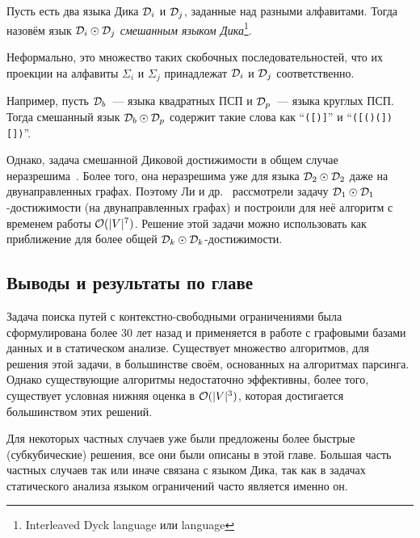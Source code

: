 \begin{definition}
  Пусть есть два языка Дика $\mathcal{D}_i$ и $\mathcal{D}_j$, заданные над разными алфавитами. Тогда назовём язык $\mathcal{D}_i \odot \mathcal{D}_j$ \textit{смешанным языком Дика}\footnote{Interleaved Dyck language или  language}.

  Неформально, это множество таких скобочных последовательностей, что их проекции на алфавиты $\Sigma_i$ и $\Sigma_j$ принадлежат $\mathcal{D}_i$ и $\mathcal{D}_j$ соответственно.

  Например, пусть $\mathcal{D}_b$~--- языка квадратных ПСП и $\mathcal{D}_p$~--- языка круглых ПСП. Тогда смешанный язык $\mathcal{D}_b \odot \mathcal{D}_p$ содержит такие слова как ``\texttt{([)]}'' и ``\texttt{([()(])[])}''.
\end{definition}

Однако, задача смешанной Диковой достижимости в общем случае неразрешима~\cite{Reps00}. Более того, она неразрешима уже для языка $\mathcal{D}_2 \odot \mathcal{D}_2$ даже на двунаправленных графах. Поэтому Ли и др.~\cite{Li21} рассмотрели задачу $\mathcal{D}_1 \odot \mathcal{D}_1$-достижимости (на двунаправленных графах) и построили для неё алгоритм с временем работы $\mathcal{O}(|V|^7)$. Решение этой задачи можно использовать как приближение для более общей $\mathcal{D}_k \odot \mathcal{D}_k$-достижимости.

\subsection{Выводы и результаты по главе}

Задача поиска путей с контекстно-свободными ограничениями была сформулирована более 30 лет назад и применяется в работе с графовыми базами данных и в статическом анализе. Существует множество алгоритмов, для решения этой задачи, в большинстве своём, основанных на алгоритмах парсинга. Однако существующие алгоритмы недостаточно эффективны, более того, существует условная нижняя оценка в $\mathcal{O}(|V|^3)$, которая достигается большинством этих решений.

Для некоторых частных случаев уже были предложены более быстрые (субкубические) решения, все они были описаны в этой главе. Большая часть частных случаев так или иначе связана с языком Дика, так как в задачах статического анализа языком ограничений часто является именно он.

